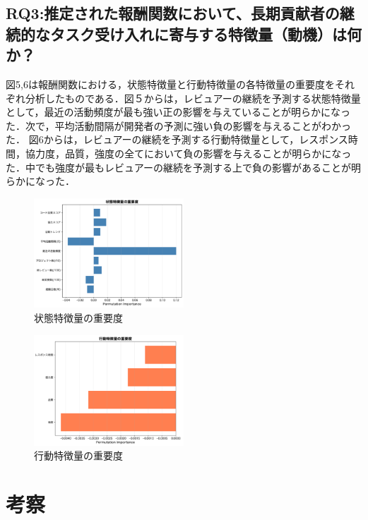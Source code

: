 \documentclass[submit,techrep,noauthor]{ipsj}
\begin{document}
\subsection{RQ3:推定された報酬関数において、長期貢献者の継続的なタスク受け入れに寄与する特徴量（動機）は何か？}
図5,6は報酬関数における，状態特徴量と行動特徴量の各特徴量の重要度をそれぞれ分析したものである．図５からは，レビュアーの継続を予測する状態特徴量として，最近の活動頻度が最も強い正の影響を与えていることが明らかになった．次で，平均活動間隔が開発者の予測に強い負の影響を与えることがわかった．
図6からは，レビュアーの継続を予測する行動特徴量として，レスポンス時間，協力度，品質，強度の全てにおいて負の影響を与えることが明らかになった．中でも強度が最もレビュアーの継続を予測する上で負の影響があることが明らかになった．

\begin{figure}[h]
    \centering
\includegraphics[width=0.5\textwidth]{./Hashimoto_fig/state.pdf}
    \caption{状態特徴量の重要度}
    \label{fig:State}
\end{figure}

\begin{figure}[h]
    \centering
\includegraphics[width=0.5\textwidth]{./Hashimoto_fig/action.pdf}
    \caption{行動特徴量の重要度}
    \label{fig:Action}
\end{figure}


\section{考察}
\label{sec:discussion}
\end{document}

